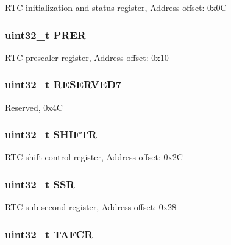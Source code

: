 R\-T\-C initialization and status register, Address offset\-: 0x0\-C \hypertarget{struct_r_t_c___type_def_ac9b4c6c5b29f3461ce3f875eea69f35b}{
\subsubsection[{P\-R\-E\-R}]{ uint32\-\_\-t P\-R\-E\-R}}\label{struct_r_t_c___type_def_ac9b4c6c5b29f3461ce3f875eea69f35b}
R\-T\-C prescaler register, Address offset\-: 0x10 \hypertarget{struct_r_t_c___type_def_a6be3d40baea405ecaf6b38462357dac0}{
\subsubsection[{R\-E\-S\-E\-R\-V\-E\-D7}]{\setlength{\rightskip}{0pt plus 5cm}uint32\-\_\-t R\-E\-S\-E\-R\-V\-E\-D7}}\label{struct_r_t_c___type_def_a6be3d40baea405ecaf6b38462357dac0}
Reserved, 0x4\-C \hypertarget{struct_r_t_c___type_def_a2372c05a6c5508e0a9adada793f68b4f}{
\subsubsection[{S\-H\-I\-F\-T\-R}]{ uint32\-\_\-t S\-H\-I\-F\-T\-R}}\label{struct_r_t_c___type_def_a2372c05a6c5508e0a9adada793f68b4f}
R\-T\-C shift control register, Address offset\-: 0x2\-C \hypertarget{struct_r_t_c___type_def_a8a868e5e76b52ced04c536be3dee08ec}{
\subsubsection[{S\-S\-R}]{ uint32\-\_\-t S\-S\-R}}\label{struct_r_t_c___type_def_a8a868e5e76b52ced04c536be3dee08ec}
R\-T\-C sub second register, Address offset\-: 0x28 \hypertarget{struct_r_t_c___type_def_a14d03244a7fda1d94b51ae9ed144ca12}{
\subsubsection[{T\-A\-F\-C\-R}]{ uint32\-\_\-t T\-A\-F\-C\-R}}\label{struct_r_t_c___type_def_a14d03244a7fda1d94b51ae9ed144ca12}
